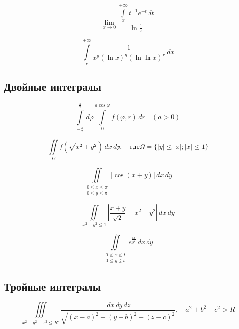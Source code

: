 \documentclass[a4paper,14pt]{article}
\begin{document}
\setcounter{equation}{2356}

\begin{equation}
\lim_{x \to 0} \dfrac{\int\limits_{x}^{+\infty} t^{-1} e^{-t} \,dt}{\ln{\frac{1}{x}}}
\end{equation}

\setcounter{equation}{2374}
\begin{equation}
\int\limits_{e}^{+\infty} \dfrac{1}{x^p \left(\ln x\right)^q \left(\ln\ln x\right)^r} \,dx
\end{equation}

\subsection{Двойные интегралы}

\setcounter{equation}{3947}
\begin{equation}
\int\limits_{-\frac{\pi}{2}}^{\frac{\pi}{2}} \, d\varphi \int\limits_{0}^{a\cos \varphi} f(\varphi,r) \, dr \quad (a>0)
\end{equation}

\setcounter{equation}{3951}
\begin{equation}
\iint\limits_{\Omega} f(\sqrt{x^2+y^2}) \,dx\,dy , \quad где \Omega =\{|y| \le |x| ; |x| \le 1\}
\end{equation}

\setcounter{equation}{3970}
\begin{equation}
\iint\limits_{\substack{0 \le x \le \pi \\ 0 \le y \le \pi}} |\cos (x+y)|\,dx\,dy
\end{equation}

\begin{equation}
\iint\limits_{x^2+y^2 \le 1} \left| \frac{x+y}{\sqrt{2}} - x^2 -y^2\right| \,dx\,dy
\end{equation}

\setcounter{equation}{3978}
\begin{equation}
\iint\limits_{\substack{0\le x \le t \\ 0\le y \le t}} e^{\frac{tx}{y^2}} \,dx\,dy
\end{equation}

\subsection{Тройные интегралы}

\setcounter{equation}{4095}
\begin{equation}
\iiint\limits_{x^2+y^2+z^2 \le R^2} \frac{\,dx\,dy\,dz}{\sqrt{(x-a)^2+(y-b)^2+(z-c)^2}},  \quad a^2+b^2+c^2 > R
\end{equation}
\end{document}

